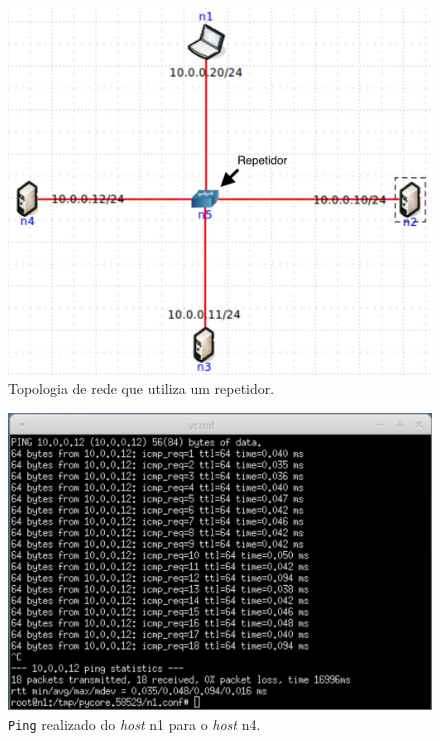 \documentclass{llncs}
\begin{document}
\begin{figure}
  \begin{center}
	  \includegraphics[scale=0.2]{./imagens/rede_23_repetidor.png} 
  \end{center}
	\caption{Topologia de rede que utiliza um repetidor.}
  \label{fig:rede_23_repetidor}
\end{figure} 

\begin{figure}
  \begin{center}
	  \includegraphics[scale=0.3]{./imagens/n1_repetidor.png} 
  \end{center}
	\caption{\texttt{Ping} realizado do \textit{host} n1 para o \textit{host} n4.}
  \label{fig:n1_repetidor}
\end{figure} 
\end{document}
